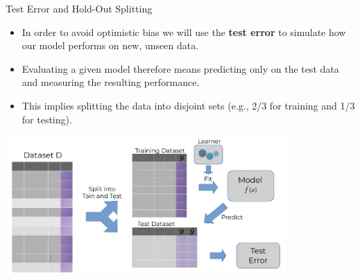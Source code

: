 \documentclass[11pt,compress,t,notes=noshow, xcolor=table]{beamer}
\begin{document}
\begin{vbframe}{Test Error and Hold-Out Splitting}


\begin{itemize}
  \item In order to avoid optimistic bias we will use the 
  \textbf{test error} to simulate how our model performs on new, unseen data.
  \item Evaluating a given model therefore means predicting only on the
  test data and measuring the resulting performance.
  \item This implies splitting the data into disjoint sets (e.g., 2/3 for 
  training and 1/3 for testing).
\end{itemize}

\begin{center}
  \includegraphics[width=0.8\textwidth]{figure_man/test_error.pdf}
\end{center}

\end{vbframe}

\end{document}
